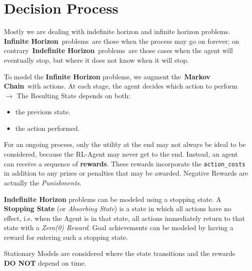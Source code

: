 \section{Decision Process}
Mostly we are dealing with indefinite horizon and infinite horizon problems.
\textbf{Infinite Horizon} problems are those when the process may go on forever; on contrary \textbf{Indefinite Horizon} problems are those cases when the agent will eventually stop, but where it does not know when it will stop.

To model the \textbf{Infinite Horizon} problems, we augment the \textbf{Markov Chain} with actions.
At each stage, the agent decides which action to perform $\rightarrow$ The Resulting State depends on both:
\begin{itemize}
    \item the previous state.
    \item the action performed.
\end{itemize}

For an ongoing process, only the utility at the end may not always be ideal to be considered, because the RL-Agent may never get to the end.
Instead, an agent can receive a sequence of \textbf{rewards}.
These rewards incorporate the \texttt{action\_costs} in addition to any prizes or penalties that may be awarded.
Negative Rewards are actually the \textit{Punishments}.

\textbf{Indefinite Horizon} problems can be modeled using a stopping state.
A \textbf{Stopping State} (or \textit{Absorbing State}) is a state in which all actions have no effect, i.e. when the Agent is in that state, all actions immediately return to that state with a \textit{Zero(0) Reward}.
Goal achievements can be modeled by having a reward for entering such a stopping state.

\begin{framedthm}[NOTE]\label{Note:NOTE_01}
    Stationary Models are considered where the state transitions and the rewards \textbf{DO NOT} depend on time.
\end{framedthm}


